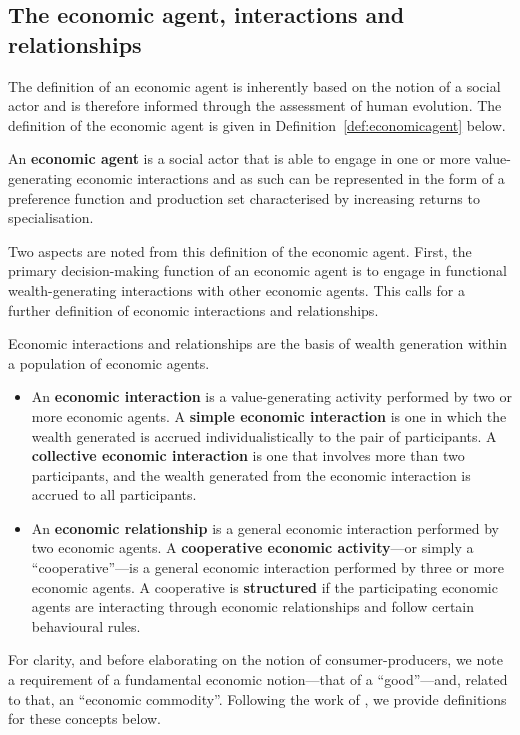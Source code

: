 \subsection{The economic agent, interactions and relationships}

The definition of an economic agent is inherently based on the notion of a social actor and is therefore informed through the assessment of human evolution. The definition of the economic agent is given in Definition~\ref{def:economicagent} below.
\begin{definition} \label{def:economicagent}
An \textbf{economic agent} is a social actor that is able to engage in one or more value-generating economic interactions and as such can be represented in the form of a preference function and production set characterised by increasing returns to specialisation.
\end{definition}
Two aspects are noted from this definition of the economic agent. First, the primary decision-making function of an economic agent is to engage in functional wealth-generating interactions with other economic agents. This calls for a further definition of economic interactions and relationships.
\begin{definition}
Economic interactions and relationships are the basis of wealth generation within a population of economic agents.
\begin{itemize}
\item An \textbf{economic interaction} is a value-generating activity performed by two or more economic agents. A \textbf{simple economic interaction} is one in which the wealth generated is accrued individualistically to the pair of participants. A \textbf{collective economic interaction} is one that involves more than two participants, and the wealth generated from the economic interaction is accrued to all participants.

\item An \textbf{economic relationship} is a general economic interaction performed by two economic agents. A \textbf{cooperative economic activity}---or simply a ``cooperative''---is a general economic interaction performed by three or more economic agents. A cooperative is \textbf{structured} if the participating economic agents are interacting through economic relationships and follow certain behavioural rules.
\end{itemize}
\end{definition}
For clarity, and before elaborating on the notion of consumer-producers, we note a requirement of a fundamental economic notion---that of a ``good''---and, related to that, an ``economic commodity''. Following the work of \citet{Lancaster1966}, we provide definitions for these concepts below.
